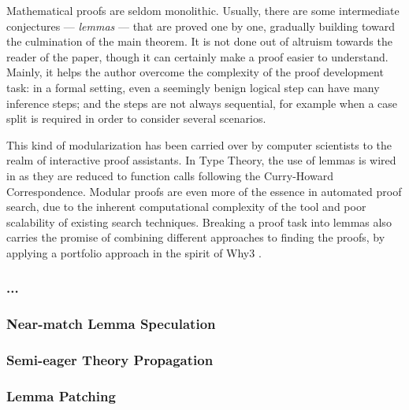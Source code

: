 Mathematical proofs are seldom monolithic.
Usually, there are some intermediate conjectures --- \emph{lemmas} --- that
are proved one by one, gradually building toward the culmination of the main
theorem.
It is not done out of altruism towards the reader of the paper, though it can
certainly make a proof easier to understand.
Mainly, it helps the author overcome the complexity of the proof development
task: in a formal setting, even a seemingly benign logical step can have many
inference steps; and the steps are not always sequential, for example when
a case split is required in order to consider several scenarios.

This kind of modularization has been carried over by computer scientists to the
realm of interactive proof assistants.
In Type Theory, the use of lemmas is wired in as they are reduced to function
calls following the Curry-Howard Correspondence.
Modular proofs are even more of the essence in automated proof search, due to
the inherent computational complexity of the tool and poor scalability of
existing search techniques.
Breaking a proof task into lemmas also carries the promise of combining different
approaches to finding the proofs, by applying a portfolio approach in the spirit
of Why3 \cite{}.

\subsubsection{...}

\subsubsection{Near-match Lemma Speculation}

\subsubsection{Semi-eager Theory Propagation}

\subsubsection{Lemma Patching}
